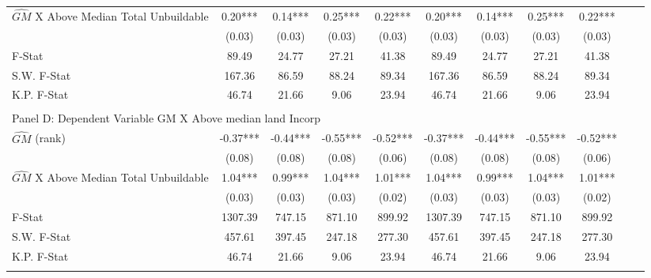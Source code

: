 \begin{table}[htbp]
\begin{threeparttable}
\begin{tabular}{l*{10}{c}}
\addlinespace
$\hat{GM}$ X Above Median Total Unbuildable&       0.20***&       0.14***&       0.25***&       0.22***&       0.20***&       0.14***&       0.25***&       0.22***\\
                &     (0.03)   &     (0.03)   &     (0.03)   &     (0.03)   &     (0.03)   &     (0.03)   &     (0.03)   &     (0.03)   \\
\midrule
F-Stat          &      89.49   &      24.77   &      27.21   &      41.38   &      89.49   &      24.77   &      27.21   &      41.38   \\
S.W. F-Stat     &     167.36   &      86.59   &      88.24   &      89.34   &     167.36   &      86.59   &      88.24   &      89.34   \\
K.P. F-Stat     &      46.74   &      21.66   &       9.06   &      23.94   &      46.74   &      21.66   &       9.06   &      23.94   \\
\cmidrule[\heavyrulewidth](lr){1-9} \\ \cmidrule[\heavyrulewidth](lr){1-9}
\multicolumn{8}{l}{Panel D: Dependent Variable GM X Above median land Incorp}\\
\cmidrule(lr){1-9}
$\hat{GM}$ (rank)&      -0.37***&      -0.44***&      -0.55***&      -0.52***&      -0.37***&      -0.44***&      -0.55***&      -0.52***\\
                &     (0.08)   &     (0.08)   &     (0.08)   &     (0.06)   &     (0.08)   &     (0.08)   &     (0.08)   &     (0.06)   \\
\addlinespace
$\hat{GM}$ X Above Median Total Unbuildable&       1.04***&       0.99***&       1.04***&       1.01***&       1.04***&       0.99***&       1.04***&       1.01***\\
                &     (0.03)   &     (0.03)   &     (0.03)   &     (0.02)   &     (0.03)   &     (0.03)   &     (0.03)   &     (0.02)   \\
\midrule
F-Stat          &    1307.39   &     747.15   &     871.10   &     899.92   &    1307.39   &     747.15   &     871.10   &     899.92   \\
S.W. F-Stat     &     457.61   &     397.45   &     247.18   &     277.30   &     457.61   &     397.45   &     247.18   &     277.30   \\
K.P. F-Stat     &      46.74   &      21.66   &       9.06   &      23.94   &      46.74   &      21.66   &       9.06   &      23.94   \\
\cmidrule[\heavyrulewidth](lr){1-9} \\ \cmidrule[\heavyrulewidth](lr){1-9}

\end{tabular}
\end{threeparttable}
\end{table}
